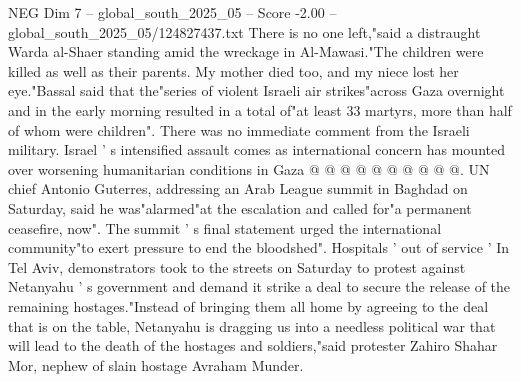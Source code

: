 \begin{textsample}{NEG Dim 7 – global\_south\_2025\_05 – Score -2.00 – global\_south\_2025\_05/124827437.txt}
There is no one left,"said a distraught Warda al-Shaer standing amid the wreckage in Al-Mawasi."The children were killed as well as their parents.
My mother died too, and my niece lost her eye."Bassal said that the"series of violent Israeli air strikes"across Gaza overnight and in the early morning resulted in a total of"at least 33 martyrs, more than half of whom were children".
There was no immediate comment from the Israeli military.
Israel ' s intensified assault comes as international concern has mounted over worsening humanitarian conditions in Gaza @ @ @ @ @ @ @ @ @ @.
UN chief Antonio Guterres, addressing an Arab League summit in Baghdad on Saturday, said he was"alarmed"at the escalation and called for"a permanent ceasefire, now".
The summit ' s final statement urged the international community"to exert pressure to end the bloodshed".
Hospitals ' out of service ' In Tel Aviv, demonstrators took to the streets on Saturday to protest against Netanyahu ' s government and demand it strike a deal to secure the release of the remaining hostages."Instead of bringing them all home by agreeing to the deal that is on the table, Netanyahu is dragging us into a needless political war that will lead to the death of the hostages and soldiers,"said protester Zahiro Shahar Mor, nephew of slain hostage Avraham Munder.

\end{textsample}
